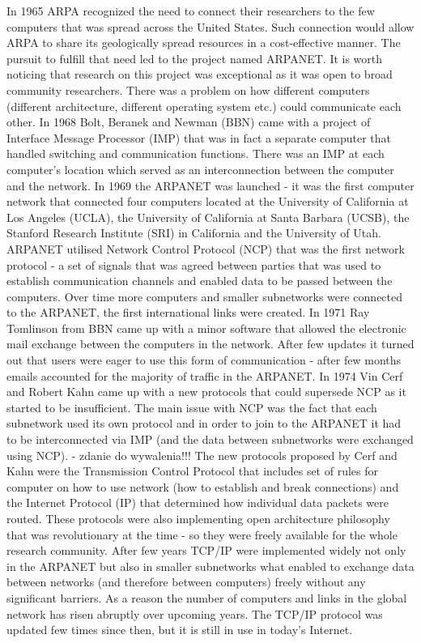 \documentclass[magisterska,en]{pracamgr}
\begin{document}
In 1965 ARPA recognized the need to connect their researchers to the few computers that was spread across the United States. Such connection would allow ARPA to share its geologically spread resources in a cost-effective manner. The pursuit to fulfill that need led to the project named ARPANET. It is worth noticing that research on this project was exceptional as it was open to broad community researchers.\cite{an_early_history_of_the_internet} There was a problem on how different computers (different architecture, different operating system etc.) could communicate each other. In 1968 Bolt, Beranek and Newman (BBN) came with a project of Interface Message Processor (IMP) that was in fact a separate computer that handled switching and communication functions. There was an IMP at each computer's location which served as an interconnection between the computer and the network. In 1969 the ARPANET was launched - it was the first computer network that connected four computers located at the University of California at Los Angeles (UCLA), the University of California at Santa Barbara (UCSB), the Stanford Research Institute (SRI) in California and the University of Utah. ARPANET utilised Network Control Protocol (NCP) that was the first network protocol - a set of signals that was agreed between parties that was used to establish communication channels and enabled data to be passed between the computers. Over time more computers and smaller subnetworks were connected to the ARPANET, the first international links were created. In 1971 Ray Tomlinson from BBN came up with a minor software that allowed the electronic mail exchange between the computers in the network. After few updates it turned out that users were eager to use this form of communication - after few months emails accounted for the majority of traffic in the ARPANET.  \cite{an_early_history_of_the_internet} In 1974 Vin Cerf and Robert Kahn came up with a new protocols that could supersede NCP as it started to be insufficient. The main issue with NCP was the fact that each subnetwork used its own protocol and in order to join to the ARPANET it had to be interconnected via IMP (and the data between subnetworks were exchanged using NCP). - zdanie do wywalenia!!! \cite{an_early_history_of_the_internet} The new protocols proposed by Cerf and Kahn were the Transmission Control Protocol that includes set of rules for computer on how to use network (how to establish and break connections) and the Internet Protocol (IP) that determined how individual data packets were routed. These protocols were also implementing open architecture philosophy that was revolutionary at the time - so they were freely available for the whole research community. \cite{Internet_History_article} After few years TCP/IP were implemented widely not only in the ARPANET but also in smaller subnetworks what enabled to exchange data between networks (and therefore between computers) freely without any significant barriers. As a reason the number of computers and links in the global network has risen abruptly over upcoming years. The TCP/IP protocol was updated few times since then, but it is still in use in today's Internet. 
\end{document}
